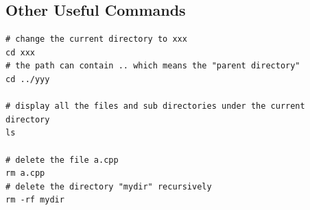\documentclass {article}
\begin{document}
\subsection{Other Useful Commands}
\begin{verbatim}
# change the current directory to xxx
cd xxx
# the path can contain .. which means the "parent directory"
cd ../yyy

# display all the files and sub directories under the current directory
ls

# delete the file a.cpp
rm a.cpp
# delete the directory "mydir" recursively
rm -rf mydir
\end{verbatim}
\end{document}
